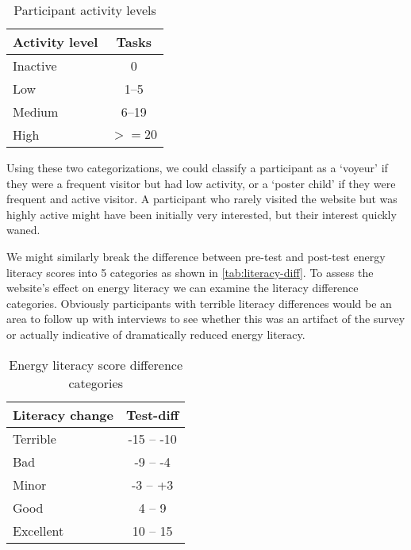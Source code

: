 \begin{table}[htbp]
	\centering
		\begin{tabular}{| l | c |}
			\hline
			Activity level & Tasks \\ \hline
			
			Inactive & 0 \\ \hline
	
			Low & 1--5 \\ \hline

			Medium & 6--19 \\ \hline

			High & $>= 20$ \\ \hline

		\end{tabular}
	\caption{Participant activity levels}
	\label{tab:activity-levels}
\end{table}

Using these two categorizations, we could classify a participant as a `voyeur' if they were a frequent visitor but had low activity, or a `poster child' if they were frequent and active visitor. A participant who rarely visited the website but was highly active might have been initially very interested, but their interest quickly waned.

We might similarly break the difference between pre-test and post-test energy literacy scores into 5 categories as shown in \autoref{tab:literacy-diff}. To assess the website's effect on energy literacy we can examine the literacy difference categories. Obviously participants with terrible literacy differences would be an area to follow up with interviews to see whether this was an artifact of the survey or actually indicative of dramatically reduced energy literacy.

\begin{table}[htbp]
	\centering
		\begin{tabular}{| l | c |}
			\hline
			Literacy change & Test-diff \\ \hline
				
			Terrible & -15 -- -10 \\ \hline

			Bad & -9 -- -4 \\ \hline

			Minor & -3 -- +3 \\ \hline

			Good & 4 -- 9 \\ \hline

			Excellent & 10 -- 15 \\ \hline

		\end{tabular}
	\caption{Energy literacy score difference categories}
	\label{tab:literacy-diff}
\end{table}

